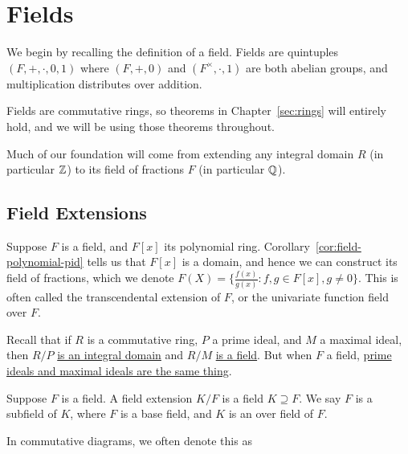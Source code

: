 \chapter{Fields}

\begin{remark}
    We begin by recalling the definition of a field.
    Fields are quintuples \((F,+,\cdot,0,1)\) where
    \((F,+,0)\) and \((F^\times,\cdot,1)\) are both abelian groups,
    and multiplication distributes over addition.
\end{remark}
\begin{remark}
    Fields are commutative rings,
    so theorems in Chapter~\ref{sec:rings} will entirely hold,
    and we will be using those theorems throughout.
\end{remark}
\begin{remark}
    Much of our foundation will come from extending any integral domain \(R\)
    (in particular \(\mathbb{Z}\))
    to its field of fractions \(F\) (in particular \(\mathbb{Q}\)).
\end{remark}


\section{Field Extensions}

\begin{definition}
    Suppose \(F\) is a field, and \(F[x]\) its polynomial ring.
    Corollary~\ref{cor:field-polynomial-pid} tells us that
    \(F[x]\) is a domain,
    and hence we can construct its field of fractions,
    which we denote \(F(X) = \{\frac{f(x)}{g(x)} : f,g \in F[x], g \neq 0\}\).
    This is often called the transcendental extension of \(F\),
    or the univariate function field over \(F\).
\end{definition}

\begin{remark}
    Recall that if \(R\) is a commutative ring,
    \(P\) a prime ideal, and \(M\) a maximal ideal,
    then \(R/P\) \hyperref[thm:prime-quotient-domain]{is an integral domain}
    and \(R/M\) \hyperref[thm:maximal-quotient-field]{is a field}.
    But when \(F\) a field,
    \hyperref[prop:pid-maximal-is-prime]{prime ideals and maximal ideals are the same thing}.
\end{remark}

\begin{definition}
    Suppose \(F\) is a field.
    A field extension \(K/F\) is a field \(K \supseteq F\).
    We say \(F\) is a subfield of \(K\),
    where \(F\) is a base field, and \(K\) is an over field of \(F\).

    In commutative diagrams, we often denote this as
    \begin{center}
    \end{center}
\end{definition}

